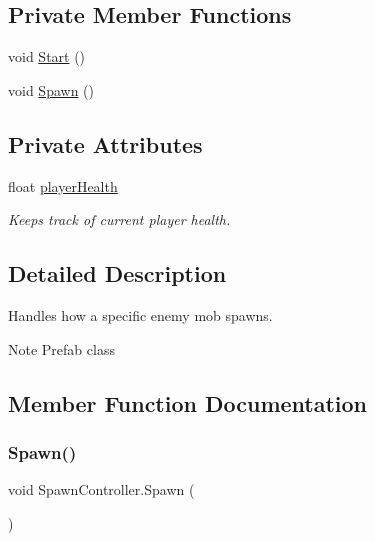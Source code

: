 \subsection*{Private Member Functions}
\begin{DoxyCompactItemize}
\item 
void \hyperlink{class_spawn_controller_a5aa835725a1507e10580c9887069f243}{Start} ()
\item 
void \hyperlink{class_spawn_controller_ac102b761c5d0f090ef09acaeb5180f8b}{Spawn} ()
\end{DoxyCompactItemize}
\subsection*{Private Attributes}
\begin{DoxyCompactItemize}
\item 
\mbox{\label{class_spawn_controller_a168d59f6d4b8be8f74aa1bd0c1dd5de3}} 
float \hyperlink{class_spawn_controller_a168d59f6d4b8be8f74aa1bd0c1dd5de3}{player\+Health}
\begin{DoxyCompactList}\small\item\em Keeps track of current player health. \end{DoxyCompactList}\end{DoxyCompactItemize}


\subsection{Detailed Description}
Handles how a specific enemy mob spawns. \begin{DoxyNote}{Note}
Prefab class 
\end{DoxyNote}


\subsection{Member Function Documentation}
\mbox{\label{class_spawn_controller_ac102b761c5d0f090ef09acaeb5180f8b}} 
\subsubsection{\texorpdfstring{Spawn()}{Spawn()}}
{\footnotesize\ttfamily void Spawn\+Controller.\+Spawn (\begin{DoxyParamCaption}{ }\end{DoxyParamCaption})\hspace{0.3cm}{\ttfamily [private]}}

